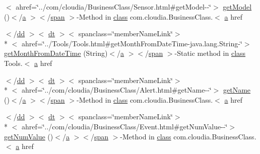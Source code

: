 \begin{DoxyCompactItemize}
$<$ ahref=\char`\"{}../com/cloudia/Business\-Class/Sensor.\-html\#get\-Model-\/-\/\char`\"{}$>$ \hyperlink{index-7_8html_ad4ec06f350e232ff6e20224536f3d35f}{get\-Model} ()$<$/\hyperlink{style_8css_a5e8981582017bb8b84c21f148345d1f7}{a} $>$$<$/\hyperlink{stylesheet_8css_a8343996ebcf16220b04e54659aac31cc}{span} $>$-\/Method in \hyperlink{_tools_8html_acf06f836132665ba8114f5a414c2403f}{class} com.\-cloudia.\-Business\-Class.$<$ \hyperlink{style_8css_a5e8981582017bb8b84c21f148345d1f7}{a} href
\item 
$<$/\hyperlink{stylesheet_8css_a47f4718a86835a7771ec592ece845221}{dd} $>$$<$ \hyperlink{stylesheet_8css_a107565fb4039d33b041380d6e0ea1d80}{dt} $>$$<$ spanclass=\char`\"{}member\-Name\-Link\char`\"{}$>$\\*
$<$ ahref=\char`\"{}../Tools/Tools.\-html\#get\-Month\-From\-Date\-Time-\/java.\-lang.\-String-\/\char`\"{}$>$ \hyperlink{index-7_8html_ae6233d9f1a6c04eb40dd6e603625a7c8}{get\-Month\-From\-Date\-Time} (String)$<$/\hyperlink{style_8css_a5e8981582017bb8b84c21f148345d1f7}{a} $>$$<$/\hyperlink{stylesheet_8css_a8343996ebcf16220b04e54659aac31cc}{span} $>$-\/Static method in \hyperlink{_tools_8html_acf06f836132665ba8114f5a414c2403f}{class} Tools.$<$ \hyperlink{style_8css_a5e8981582017bb8b84c21f148345d1f7}{a} href
\item 
$<$/\hyperlink{stylesheet_8css_a47f4718a86835a7771ec592ece845221}{dd} $>$$<$ \hyperlink{stylesheet_8css_a107565fb4039d33b041380d6e0ea1d80}{dt} $>$$<$ spanclass=\char`\"{}member\-Name\-Link\char`\"{}$>$\\*
$<$ ahref=\char`\"{}../com/cloudia/Business\-Class/Alert.\-html\#get\-Name-\/-\/\char`\"{}$>$ \hyperlink{index-7_8html_ade469556c45c624df3849aff200d2375}{get\-Name} ()$<$/\hyperlink{style_8css_a5e8981582017bb8b84c21f148345d1f7}{a} $>$$<$/\hyperlink{stylesheet_8css_a8343996ebcf16220b04e54659aac31cc}{span} $>$-\/Method in \hyperlink{_tools_8html_acf06f836132665ba8114f5a414c2403f}{class} com.\-cloudia.\-Business\-Class.$<$ \hyperlink{style_8css_a5e8981582017bb8b84c21f148345d1f7}{a} href
\item 
$<$/\hyperlink{stylesheet_8css_a47f4718a86835a7771ec592ece845221}{dd} $>$$<$ \hyperlink{stylesheet_8css_a107565fb4039d33b041380d6e0ea1d80}{dt} $>$$<$ spanclass=\char`\"{}member\-Name\-Link\char`\"{}$>$\\*
$<$ ahref=\char`\"{}../com/cloudia/Business\-Class/Event.\-html\#get\-Num\-Value-\/-\/\char`\"{}$>$ \hyperlink{index-7_8html_a17e502a076b4e03c9980cb71babd08ea}{get\-Num\-Value} ()$<$/\hyperlink{style_8css_a5e8981582017bb8b84c21f148345d1f7}{a} $>$$<$/\hyperlink{stylesheet_8css_a8343996ebcf16220b04e54659aac31cc}{span} $>$-\/Method in \hyperlink{_tools_8html_acf06f836132665ba8114f5a414c2403f}{class} com.\-cloudia.\-Business\-Class.$<$ \hyperlink{style_8css_a5e8981582017bb8b84c21f148345d1f7}{a} href

\end{DoxyCompactItemize}
